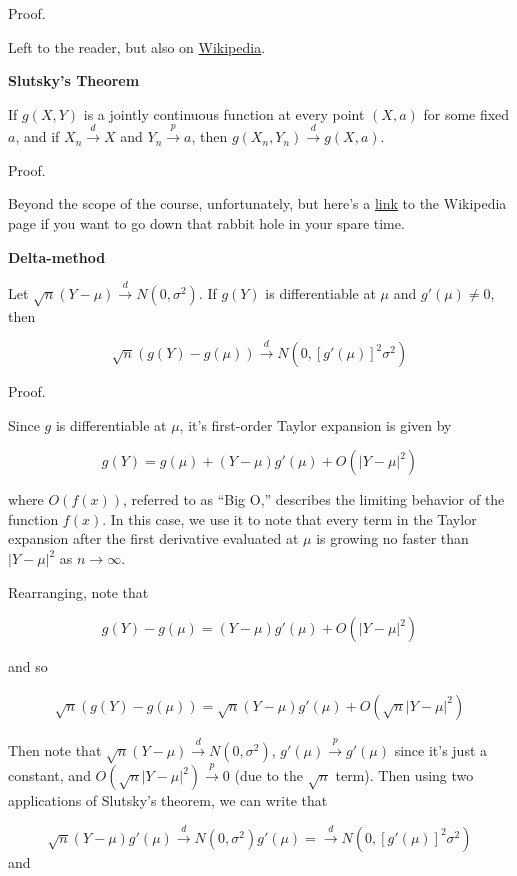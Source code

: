 \documentclass[
  letterpaper,
  DIV=11,
  numbers=noendperiod]{scrreprt}
\begin{document}
Proof.

Left to the reader, but also on
\href{https://en.wikipedia.org/wiki/Continuous_mapping_theorem\#Proof}{Wikipedia}.

\textbf{Slutsky's Theorem}

If \(g(X, Y)\) is a jointly continuous function at every point
\((X, a)\) for some fixed \(a\), and if \(X_n \overset{d}{\to} X\) and
\(Y_n \overset{p}{\to} a\), then
\(g(X_n, Y_n) \overset{d}{\to} g(X, a)\).

Proof.

Beyond the scope of the course, unfortunately, but here's a
\href{https://en.wikipedia.org/wiki/Slutsky\%27s_theorem\#Proof}{link}
to the Wikipedia page if you want to go down that rabbit hole in your
spare time.

\textbf{Delta-method}

Let \(\sqrt{n} (Y - \mu) \overset{d}{\to} N(0, \sigma^2)\). If \(g(Y)\)
is differentiable at \(\mu\) and \(g'(\mu) \neq 0\), then

\[
\sqrt{n} \left( g(Y) - g(\mu)\right) \overset{d}{\to} N(0, [g'(\mu)]^2 \sigma^2)
\]

Proof.

Since \(g\) is differentiable at \(\mu\), it's first-order Taylor
expansion is given by

\[
g(Y) = g(\mu) + (Y - \mu)g'(\mu) + O(| Y - \mu |^2)
\]

where \(O(f(x))\), referred to as ``Big O,'' describes the limiting
behavior of the function \(f(x)\). In this case, we use it to note that
every term in the Taylor expansion after the first derivative evaluated
at \(\mu\) is growing no faster than \(|Y - \mu|^2\) as
\(n \to \infty\).

Rearranging, note that

\[
g(Y) - g(\mu) =  (Y - \mu)g'(\mu) + O(| Y - \mu |^2)
\]

and so

\begin{align*}
    \sqrt{n}\left( g(Y) - g(\mu) \right) = \sqrt{n}(Y - \mu) g'(\mu) + O(\sqrt{n} |Y - \mu|^2)
\end{align*}

Then note that \(\sqrt{n}(Y - \mu) \overset{d}{\to} N(0, \sigma^2)\),
\(g'(\mu) \overset{p}{\to} g'(\mu)\) since it's just a constant, and
\(O(\sqrt{n} |Y - \mu|^2) \overset{p}{\to} 0\) (due to the \(\sqrt{n}\)
term). Then using two applications of Slutsky's theorem, we can write
that

\[
\sqrt{n}(Y - \mu)g'(\mu) \overset{d}{\to} N(0, \sigma^2)g'(\mu) = \overset{d}{\to} N(0, [g'(\mu)]^2\sigma^2)
\] and
\end{document}
